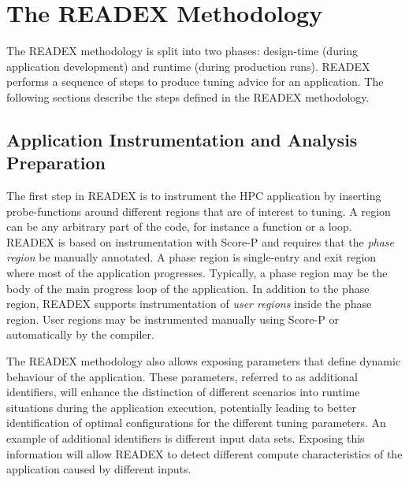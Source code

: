 \section{The READEX Methodology} \label{sec:methodology}

The READEX methodology is split into two phases: design-time (during application development) and runtime (during production runs). READEX performs a sequence of steps to produce tuning advice for an application. The following sections describe the steps defined in the READEX methodology.


\subsection{Application Instrumentation and Analysis Preparation}
\label{sec:application_instrumentation}
The first step in READEX is to instrument the HPC application by inserting probe-functions around different regions that are of interest to tuning. A region can be any arbitrary part of the code, for instance a function or a loop. READEX is based on instrumentation with Score-P and requires that the \textit{phase region} be manually annotated. A phase region is single-entry and exit region where most of the application progresses. Typically, a phase region may be the body of the main progress loop of the application. In addition to the phase region, READEX supports instrumentation of \textit{user regions} inside the phase region. User regions may be instrumented manually using Score-P or automatically by the compiler.

The READEX methodology also allows exposing parameters that define dynamic behaviour of the application. These parameters, referred to as additional identifiers, will enhance the distinction of different scenarios into runtime situations during the application execution, potentially leading to better identification of optimal configurations for the different tuning parameters. An example of additional identifiers is different input data sets. Exposing this information will allow READEX to detect different compute characteristics of the application caused by different inputs.


